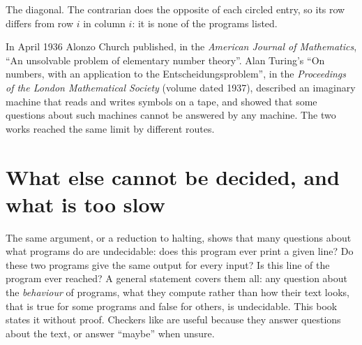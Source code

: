 \begin{omfigure}

{\small The diagonal. The contrarian does the opposite of each circled entry, so its row differs from row $i$ in
column $i$: it is none of the programs listed.}
\end{omfigure}

\begin{history}
In April 1936 Alonzo Church published, in the \emph{American Journal of Mathematics}, ``An unsolvable problem of
elementary number theory''. Alan Turing's ``On  numbers, with an application to the
Entscheidungsproblem'', in the \emph{Proceedings of the London Mathematical Society} (volume dated 1937), described
an imaginary machine that reads and writes symbols on a tape, and showed that some questions about such machines
cannot be answered by any machine. The two works reached the same limit by different routes.
\end{history}

\section{What else cannot be decided, and what is too slow}\label{sec:g12:halting-problem:more}

The same argument, or a reduction to halting, shows that many questions about what programs do are undecidable: does
this program ever print a given line? Do these two programs give the same output for every input? Is this line of
the program ever reached? A general statement covers them all: any question about the \emph{behaviour} of programs,
what they compute rather than how their text looks, that is true for some programs and false for others, is
undecidable. This book states it without proof. Checkers like  are useful because they answer questions
about the text, or answer ``maybe'' when unsure.


